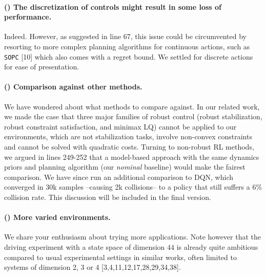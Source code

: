 \documentclass{article}
\begin{document}
\paragraph{() The discretization of controls might result in some loss of performance.}
Indeed. However, as suggested in line 67, this issue could be circumvented by resorting to more complex planning algorithms for continuous actions, such as \texttt{SOPC} [10] which also comes with a regret bound. We settled for discrete actions for ease of presentation.

\paragraph{() Comparison against other methods.}
We have wondered about what methods to compare against. In our related work, we made the case that three major families of robust control (robust stabilization, robust constraint satisfaction, and minimax LQ) cannot be applied to our environments, which are not stabilization tasks, involve non-convex constraints and cannot be solved with quadratic costs. Turning to non-robust RL methods, we argued in lines 249-252 that a model-based approach with the same dynamics priors and planning algorithm (our \textit{nominal} baseline) would make the fairest comparison. We have since run an additional comparison to DQN, which converged in 30k samples --causing 2k collisions-- to a policy that still suffers a 6\% collision rate. This discussion will be included in the final version. 

\paragraph{() More varied environments.} We share your enthusiasm about trying more applications. Note however that the driving experiment with a state space of dimension $44$ is already quite ambitious compared to usual experimental settings in similar works, often limited to systems of dimension 2, 3 or 4 [3,4,11,12,17,28,29,34,38].
\end{document}

